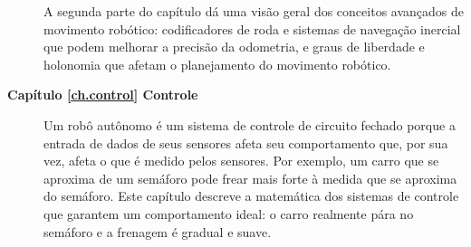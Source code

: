 \begin{description}
A segunda parte do capítulo dá uma visão geral dos conceitos avançados de movimento robótico: codificadores de roda e sistemas de navegação inercial que podem melhorar a precisão da odometria, e graus de liberdade e holonomia que afetam o planejamento do movimento robótico.

\item [\textbf{Capítulo \ref{ch.control} Controle}] Um robô autônomo é um sistema de controle de circuito fechado porque a entrada de dados de seus sensores afeta seu comportamento que, por sua vez, afeta o que é medido pelos sensores. Por exemplo, um carro que se aproxima de um semáforo pode frear mais forte à medida que se aproxima do semáforo. Este capítulo descreve a matemática dos sistemas de controle que garantem um comportamento ideal: o carro realmente pára no semáforo e a frenagem é gradual e suave.
\end{description}


